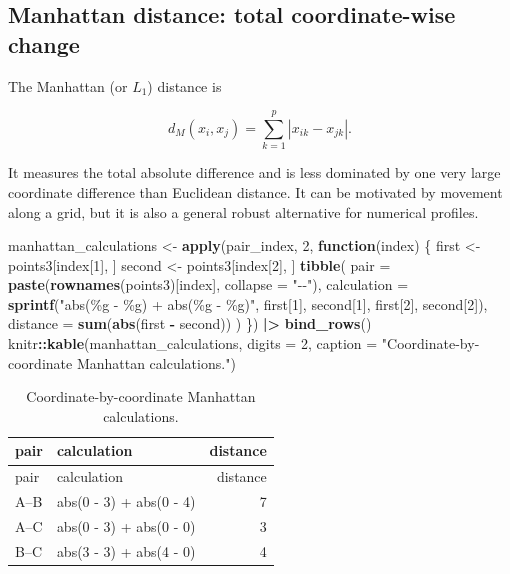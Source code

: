 \documentclass[
  english,
]{article}
\newenvironment{Shaded}{\begin{snugshade}}{\end{snugshade}}
\newcommand{\AttributeTok}[1]{\textcolor[rgb]{0.13,0.29,0.53}{#1}}
\newcommand{\ControlFlowTok}[1]{\textcolor[rgb]{0.13,0.29,0.53}{\textbf{#1}}}
\newcommand{\DecValTok}[1]{\textcolor[rgb]{0.00,0.00,0.81}{#1}}
\newcommand{\FunctionTok}[1]{\textcolor[rgb]{0.13,0.29,0.53}{\textbf{#1}}}
\newcommand{\NormalTok}[1]{#1}
\newcommand{\OtherTok}[1]{\textcolor[rgb]{0.56,0.35,0.01}{#1}}
\newcommand{\SpecialCharTok}[1]{\textcolor[rgb]{0.81,0.36,0.00}{\textbf{#1}}}
\newcommand{\StringTok}[1]{\textcolor[rgb]{0.31,0.60,0.02}{#1}}
\begin{document}
\subsection{Manhattan distance: total coordinate-wise
change}\label{manhattan-distance-total-coordinate-wise-change}

The Manhattan (or \(L_1\)) distance is

\[d_M(x_i,x_j)=\sum_{k=1}^p |x_{ik}-x_{jk}|.\]

It measures the total absolute difference and is less dominated by one
very large coordinate difference than Euclidean distance. It can be
motivated by movement along a grid, but it is also a general robust
alternative for numerical profiles.

\begin{Shaded}
\begin{Highlighting}[]
\NormalTok{manhattan\_calculations }\OtherTok{\textless{}{-}} \FunctionTok{apply}\NormalTok{(pair\_index, }\DecValTok{2}\NormalTok{, }\ControlFlowTok{function}\NormalTok{(index) \{}
\NormalTok{  first }\OtherTok{\textless{}{-}}\NormalTok{ points3[index[}\DecValTok{1}\NormalTok{], ]}
\NormalTok{  second }\OtherTok{\textless{}{-}}\NormalTok{ points3[index[}\DecValTok{2}\NormalTok{], ]}
  \FunctionTok{tibble}\NormalTok{(}
    \AttributeTok{pair =} \FunctionTok{paste}\NormalTok{(}\FunctionTok{rownames}\NormalTok{(points3)[index], }\AttributeTok{collapse =} \StringTok{"{-}{-}"}\NormalTok{),}
    \AttributeTok{calculation =} \FunctionTok{sprintf}\NormalTok{(}\StringTok{"abs(\%g {-} \%g) + abs(\%g {-} \%g)"}\NormalTok{,}
\NormalTok{                        first[}\DecValTok{1}\NormalTok{], second[}\DecValTok{1}\NormalTok{], first[}\DecValTok{2}\NormalTok{], second[}\DecValTok{2}\NormalTok{]),}
    \AttributeTok{distance =} \FunctionTok{sum}\NormalTok{(}\FunctionTok{abs}\NormalTok{(first }\SpecialCharTok{{-}}\NormalTok{ second))}
\NormalTok{  )}
\NormalTok{\}) }\SpecialCharTok{|\textgreater{}} \FunctionTok{bind\_rows}\NormalTok{()}
\NormalTok{knitr}\SpecialCharTok{::}\FunctionTok{kable}\NormalTok{(manhattan\_calculations, }\AttributeTok{digits =} \DecValTok{2}\NormalTok{,}
             \AttributeTok{caption =} \StringTok{"Coordinate{-}by{-}coordinate Manhattan calculations."}\NormalTok{)}
\end{Highlighting}
\end{Shaded}

\begin{longtable}[]{@{}llr@{}}
\caption{Coordinate-by-coordinate Manhattan
calculations.}\tabularnewline
\toprule\noalign{}
pair & calculation & distance \\
\midrule\noalign{}
\endfirsthead
\toprule\noalign{}
pair & calculation & distance \\
\midrule\noalign{}
\endhead
\bottomrule\noalign{}
\endlastfoot
A--B & abs(0 - 3) + abs(0 - 4) & 7 \\
A--C & abs(0 - 3) + abs(0 - 0) & 3 \\
B--C & abs(3 - 3) + abs(4 - 0) & 4 \\
\end{longtable}
\end{document}
